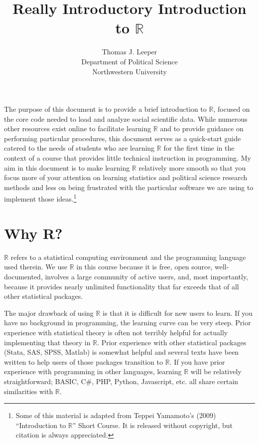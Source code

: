\documentclass[12pt]{article}
\title{Really Introductory Introduction to $\mathbb{R}$}
\author{Thomas J. Leeper\\
Department of Political Science\\
Northwestern University}
\begin{document}
\maketitle

{\abstract The purpose of this document is to provide a brief introduction to $\mathbb{R}$, focused on the core code needed to load and analyze social scientific data. While numerous other resources exist online to facilitate learning $\mathbb{R}$ and to provide guidance on performing particular procedures, this document serves as a quick-start guide catered to the needs of students who are learning $\mathbb{R}$ for the first time in the context of a course that provides little technical instruction in programming. My aim in this document is to make learning $\mathbb{R}$ relatively more smooth so that you focus more of your attention on learning statistics and political science research methods and less on being frustrated with the particular software we are using to implement those ideas.\footnote{Some of this material is adapted from Teppei Yamamoto's (2009) ``Introduction to $\mathbb{R}$'' Short Course. It is released without copyright, but citation is always appreciated.}}

\section{Why R?}\label{sec:intro}
$\mathbb{R}$ refers to a statistical computing environment and the programming language used therein. We use $\mathbb{R}$ in this course because it is free, open source, well-documented, involves a large community of active users, and, most importantly, because it provides nearly unlimited functionality that far exceeds that of all other statistical packages.

The major drawback of using $\mathbb{R}$ is that it is difficult for new users to learn. If you have no background in programming, the learning curve can be very steep. Prior experience with statistical theory is often not terribly helpful for actually implementing that theory in $\mathbb{R}$. Prior experience with other statistical packages (Stata, SAS, SPSS, Matlab) is somewhat helpful and several texts have been written to help users of those packages transition to $\mathbb{R}$. If you have prior experience with programming in other languages, learning $\mathbb{R}$ will be relatively straightforward; BASIC, C\#, PHP, Python, Javascript, etc. all share certain similarities with $\mathbb{R}$.
\end{document}
